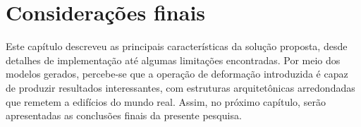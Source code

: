 \section{Considerações finais}
\label{sec:consideracoes_capitulo_5}

Este capítulo descreveu as principais características da solução proposta, desde detalhes de implementação até algumas limitações encontradas. Por meio dos modelos gerados, percebe-se que a operação de deformação introduzida é capaz de produzir resultados interessantes, com estruturas arquitetônicas arredondadas que remetem a edifícios do mundo real. Assim, no próximo capítulo, serão apresentadas as conclusões finais da presente pesquisa.